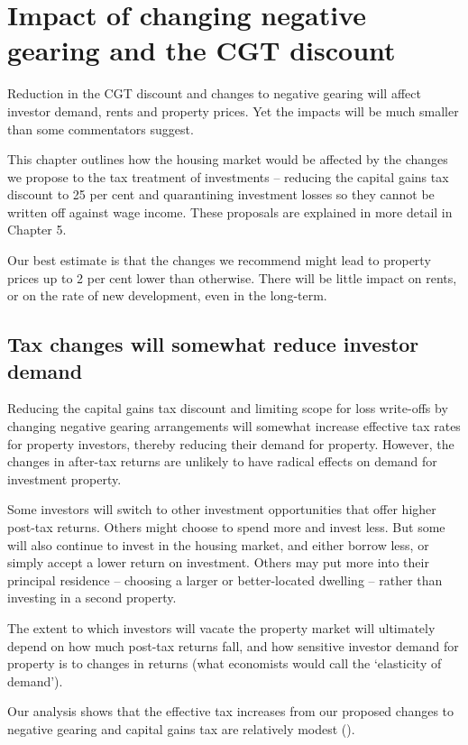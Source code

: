 \documentclass{grattanAlpha}\usepackage[]{graphicx}\usepackage[]{color}
\begin{document}
\chapter{Impact of changing negative gearing and the CGT discount}\label{chapter:Impacts}
Reduction in the CGT discount and changes to negative gearing will affect investor demand, rents and property prices. Yet the impacts will be much smaller than some commentators suggest. 

This chapter outlines how the housing market would be affected by the changes we propose to the tax treatment of investments – reducing the capital gains tax discount to 25 per cent and quarantining investment losses so they cannot be written off against wage income. 
These proposals are explained in more detail in Chapter 5. 

Our best estimate is that the changes we recommend might lead to property prices up to 2 per cent lower than otherwise. There will be little impact on rents, or on the rate of new development, even in the long-term.


\section{Tax changes will somewhat reduce investor demand}
Reducing the capital gains tax discount and limiting scope for loss write-offs by changing negative gearing arrangements will somewhat increase effective tax rates for property investors, thereby reducing their demand for property. 
However, the changes in after-tax returns are unlikely to have radical effects on demand for investment property.

Some investors will switch to other investment opportunities that offer higher post-tax returns. Others might choose to spend more and invest less. But some will also continue to invest in the housing market, and either borrow less, or simply accept a lower return on investment. Others may put more into their principal residence – choosing a larger or better-located dwelling – rather than investing in a second property.

The extent to which investors will vacate the property market will ultimately depend on how much post-tax returns fall, and how sensitive investor demand for property is to changes in returns (what economists would call the ‘elasticity of demand’).

Our analysis shows that the effective tax increases from our proposed changes to negative gearing and capital gains tax are relatively modest (). 
\end{document}
